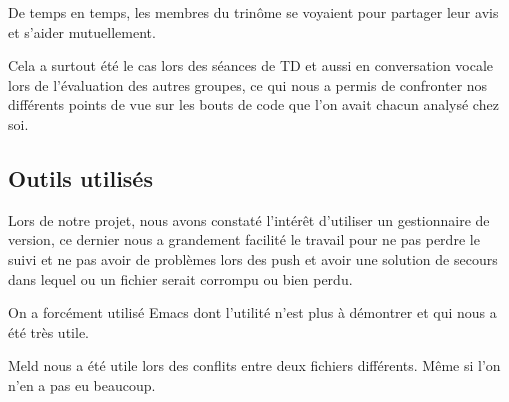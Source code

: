 \documentclass{article}
\begin{document}
De temps en temps, les membres du trinôme se voyaient pour partager leur avis et s'aider mutuellement.

Cela a surtout été le cas lors des séances de TD et aussi en conversation vocale lors de l'évaluation des autres groupes, ce qui nous a permis de confronter nos différents points de vue sur les bouts de code que l'on avait chacun analysé chez soi.

\subsection{Outils utilisés}
Lors de notre projet, nous avons constaté l'intérêt d'utiliser un gestionnaire de version, ce dernier nous a grandement facilité le travail pour ne pas perdre le suivi et ne pas avoir de problèmes lors 
des push et avoir une solution de secours dans lequel ou un fichier serait corrompu ou bien perdu.

On a forcément utilisé Emacs dont l'utilité n'est plus à démontrer et qui nous a été très utile.

Meld nous a été utile lors des conflits entre deux fichiers différents. Même si l'on n'en a pas eu beaucoup.
\end{document}
